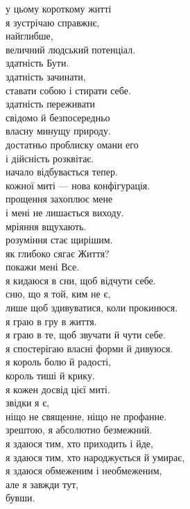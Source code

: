 у цьому короткому житті\\
я зустрічаю справжнє,\\
найглибше,\\
величний людський потенціал.\\

здатність Бути.\\
здатність зачинати,\\
ставати собою і стирати себе.\\
здатність переживати\\
свідомо й безпосередньо\\
власну минущу природу.\\

достатньо проблиску омани его\\
і дійсність розквітає.\\
начало відбувається тепер.\\
кожної миті --- нова конфігурація.\\
прощення захоплює мене\\
і мені не лишається виходу.\\

мріяння вщухають.\\
розуміння стає щирішим.\\
як глибоко сягає Життя?\\
покажи мені Все.\\

я кидаюся в сни, щоб відчути себе.\\
сню, що я той, ким не є,\\
лише щоб здивуватися, коли прокинюся.\\

я граю в гру в життя.\\
я граю в те, щоб звучати й чути себе.\\
я спостерігаю власні форми й дивуюся.\\
я король болю й радості,\\
король тиші й крику.\\
я кожен досвід цієї миті.\\

звідки я є,\\
ніщо не священне, ніщо не профанне.\\
зрештою, я абсолютно безмежний.\\

я здаюся тим, хто приходить і йде,\\
я здаюся тим, хто народжується й умирає,\\
я здаюся обмеженим і необмеженим,\\
але я завжди тут,\\
бувши.\\
